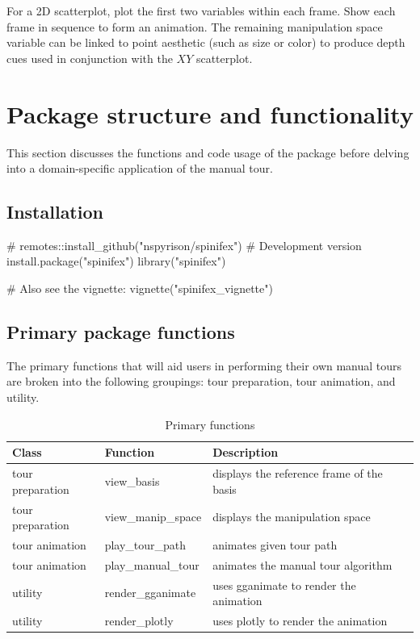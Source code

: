 For a 2D scatterplot, plot the first two variables within each frame.
Show each frame in sequence to form an animation. The remaining
manipulation space variable can be linked to point aesthetic (such as
size or color) to produce depth cues used in conjunction with the \(XY\)
scatterplot.

\hypertarget{sec:usage}{%
\section{Package structure and functionality}\label{sec:usage}}

This section discusses the functions and code usage of the package
before delving into a domain-specific application of the manual tour.

\hypertarget{installation}{%
\subsection{Installation}\label{installation}}

\begin{Schunk}
\begin{Sinput}
# remotes::install_github("nspyrison/spinifex") # Development version
install.package("spinifex")
library("spinifex")

# Also see the vignette: 
vignette("spinifex_vignette")
\end{Sinput}
\end{Schunk}

\hypertarget{primary-package-functions}{%
\subsection{Primary package functions}\label{primary-package-functions}}

The primary functions that will aid users in performing their own manual
tours are broken into the following groupings: tour preparation, tour
animation, and utility.

\begin{Schunk}
\begin{table}[t]

\caption{\label{tab:functionsTable}Primary functions}
\centering
\begin{tabular}{lll}
\toprule
Class & Function & Description\\
\midrule
tour preparation & view\_basis & displays the reference frame of the basis\\
tour preparation & view\_manip\_space & displays the manipulation space\\
tour animation & play\_tour\_path & animates given tour path\\
tour animation & play\_manual\_tour & animates the manual tour algorithm\\
utility & render\_gganimate & uses gganimate to render the animation\\
\addlinespace
utility & render\_plotly & uses plotly to render the animation\\
\bottomrule
\end{tabular}
\end{table}

\end{Schunk}

